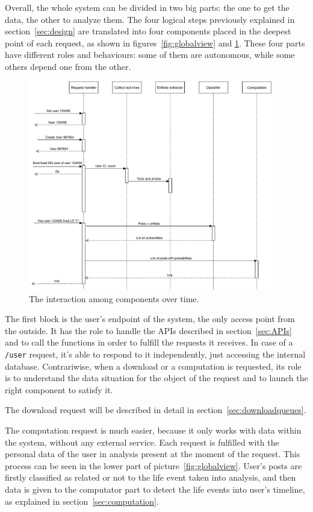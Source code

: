 Overall, the whole system can be divided in two big parts: the one to get the data, the other to analyze them. The four logical steps previously explained in section~\ref{sec:design} are translated into four components placed in the deepest point of each request, as shown in figures~\ref{fig:globalview} and \ref{fig:interaction}. These four parts have different roles and behaviours: some of them are autonomous, while some others depend one from the other.

\begin{figure}
\centering
\includegraphics[width=%
0.95\textwidth]{img/Interaction}
\caption{The interaction among components over time.}
\label{fig:interaction}
\end{figure}

The first block is the user's endpoint of the system, the only access point from the outside. It has the role to handle the APIs described in section~\ref{sec:APIs} and to call the functions in order to fulfill the requests it receives. In case of a \texttt{/user} request, it's able to respond to it independently, just accessing the internal database. Contrariwise, when a download or a computation is requested, its role is to understand the data situation for the object of the request and to launch the right component to satisfy it.

The download request will be described in detail in section~\ref{sec:downloadqueues}.

The computation request is much easier, because it only works with data within the system, without any external service. Each request is fulfilled with the personal data of the user in analysis present at the moment of the request. This process can be seen in the lower part of picture~\ref{fig:globalview}. User's posts are firstly classified as related or not to the life event taken into analysis, and then data is given to the computator part to detect the life events into user's timeline, as explained in section~\ref{sec:computation}. 

